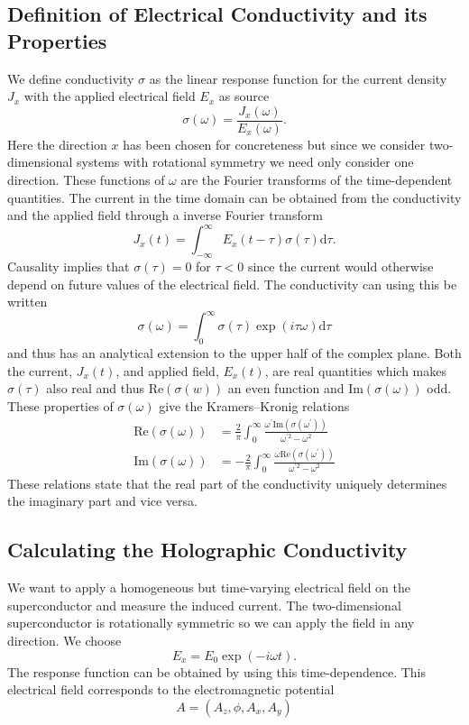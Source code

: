\documentclass[12pt]{report}
\renewcommand{\d}{\ensuremath{\mathrm{d}}}
\renewcommand{\i}{\ensuremath{i}}
\newcommand{\re}{\ensuremath{\mathrm{Re}}}
\newcommand{\im}{\ensuremath{\mathrm{Im}}}
\newcommand{\At}{\ensuremath{{\phi}}}
\begin{document}
\subsection{Definition of Electrical Conductivity and its Properties}
We define conductivity $\sigma$ as the linear response function for the current density $J_x$ with the applied electrical field $E_x$ as source
\begin{equation}
 \sigma(\omega)=\frac{J_x(\omega)}{E_x(\omega)}\label{sigma}.
\end{equation}
Here the direction $x$ has been chosen for concreteness but since we consider two-dimensional systems with rotational symmetry we need only consider one direction. These functions of $\omega$ are the Fourier transforms of the time-dependent quantities. The current in the time domain can be obtained from the conductivity and the applied field through a inverse Fourier transform
\begin{equation}
 J_x(t)=\int_{-\infty}^\infty E_x(t-\tau)\sigma(\tau)\d \tau.
\end{equation}
Causality implies that $\sigma(\tau)=0$ for $\tau<0$ since the current would otherwise depend on future values of the electrical field. The conductivity can using this be written
\begin{equation}
 \sigma(\omega)=\int_0^\infty\sigma(\tau)\exp(\i\tau\omega)\d\tau
\end{equation}
and thus has an analytical extension to the upper half of the complex plane. Both the current, $J_x(t)$, and applied field, $E_x(t)$, are real quantities which makes $\sigma(\tau)$ also real and thus $\re(\sigma(w))$ an even function and $\im(\sigma(\omega))$ odd. These properties of $\sigma(\omega)$ give the Kramers–Kronig relations
\begin{equation}
\begin{split}
 \re(\sigma(\omega))&=\frac{2}{\pi}\int_0^\infty\frac{\omega^\prime\im(\sigma(\omega^\prime))}{\omega^{\prime 2}-\omega^2}\\
\im(\sigma(\omega))&=-\frac{2}{\pi}\int_0^\infty\frac{\omega\re(\sigma(\omega^\prime))}{\omega^{\prime 2}-\omega^2}\label{kk}
\end{split}
\end{equation}
These relations state that the real part of the conductivity uniquely determines the imaginary part and vice versa.
\subsection{Calculating the Holographic Conductivity}
We want to apply a homogeneous but time-varying electrical field on the superconductor and measure the induced current. The two-dimensional superconductor is rotationally symmetric so we can apply the field in any direction. We choose
\begin{equation}
 E_x=E_0\exp(-\i\omega t).
\end{equation}
The response function can be obtained by using this time-dependence. This electrical field corresponds to the electromagnetic potential
\begin{equation}
 A=(A_z,\At,A_x,A_y)
\end{equation}
\end{document}
